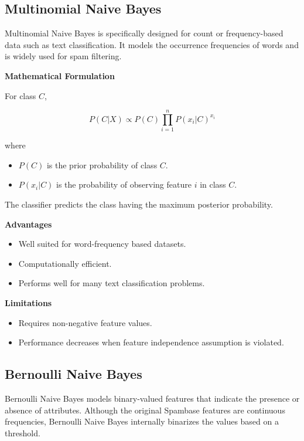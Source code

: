 \documentclass[12pt,a4paper]{article}
\begin{document}
	\subsection{Multinomial Naive Bayes}
	
	Multinomial Naive Bayes is specifically designed for count or frequency-based data such as text classification. It models the occurrence frequencies of words and is widely used for spam filtering.
	
	\textbf{Mathematical Formulation}
	
	For class $C$,
	
	\[
	P(C|X)
	\propto
	P(C)
	\prod_{i=1}^{n}
	P(x_i|C)^{x_i}
	\]
	
	where
	
	\begin{itemize}
		\item $P(C)$ is the prior probability of class $C$.
		\item $P(x_i|C)$ is the probability of observing feature $i$ in class $C$.
	\end{itemize}
	
	The classifier predicts the class having the maximum posterior probability.
	
	\textbf{Advantages}
	
	\begin{itemize}
		\item Well suited for word-frequency based datasets.
		\item Computationally efficient.
		\item Performs well for many text classification problems.
	\end{itemize}
	
	\textbf{Limitations}
	
	\begin{itemize}
		\item Requires non-negative feature values.
		\item Performance decreases when feature independence assumption is violated.
	\end{itemize}
	
	\subsection{Bernoulli Naive Bayes}
	
	Bernoulli Naive Bayes models binary-valued features that indicate the presence or absence of attributes. Although the original Spambase features are continuous frequencies, Bernoulli Naive Bayes internally binarizes the values based on a threshold.
	
\end{document}
